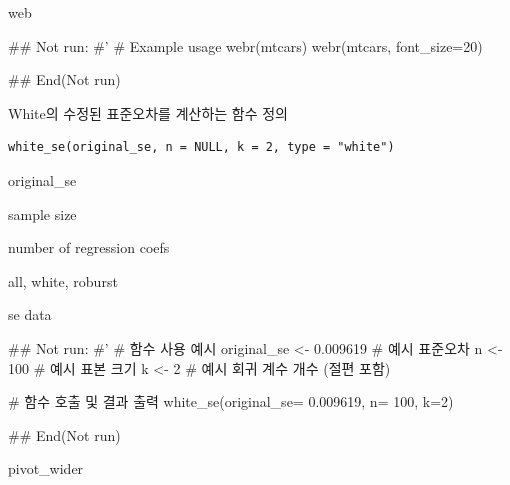 \documentclass[a4paper]{book}
\begin{document}
%
\begin{Value}
web
\end{Value}
%
\begin{Examples}
\begin{ExampleCode}

\#\# Not run: 
#'
# Example usage
webr(mtcars)
webr(mtcars, font_size=20)

## End(Not run)

\end{ExampleCode}
\end{Examples}
%
\begin{Description}
White의 수정된 표준오차를 계산하는 함수 정의
\end{Description}
%
\begin{Usage}
\begin{verbatim}
white_se(original_se, n = NULL, k = 2, type = "white")
\end{verbatim}
\end{Usage}
%
\begin{Arguments}
\begin{ldescription}
\item[\code{original\_se}] original\_se

\item[\code{n}] sample size

\item[\code{k}] number of regression coefs

\item[\code{type}] all, white, roburst
\end{ldescription}
\end{Arguments}
%
\begin{Value}
se data
\end{Value}
%
\begin{Examples}
\begin{ExampleCode}
\#\# Not run: 
#'
# 함수 사용 예시
original_se <- 0.009619  # 예시 표준오차
n <- 100  # 예시 표본 크기
k <- 2  # 예시 회귀 계수 개수 (절편 포함)

# 함수 호출 및 결과 출력
white_se(original_se= 0.009619, n= 100, k=2)

## End(Not run)

\end{ExampleCode}
\end{Examples}
%
\begin{Description}
pivot\_wider
\end{Description}
\end{document}
